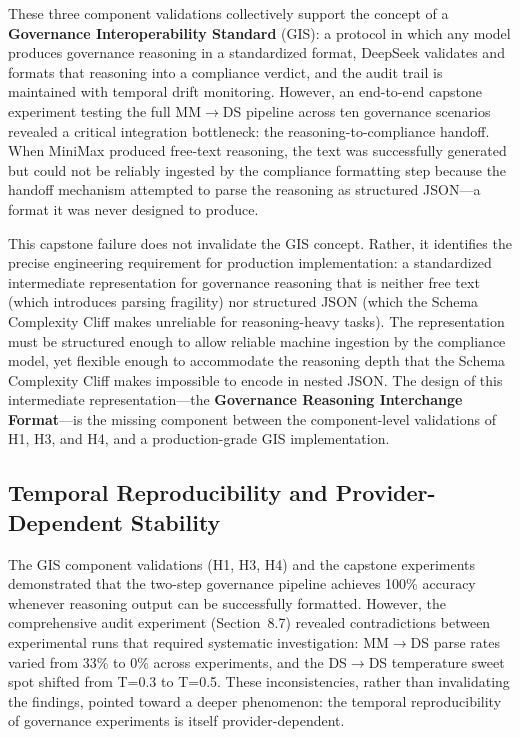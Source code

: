 \documentclass[11pt,a4paper]{article}
\begin{document}
These three component validations collectively support the concept of a \textbf{Governance Interoperability Standard} (GIS): a protocol in which any model produces governance reasoning in a standardized format, DeepSeek validates and formats that reasoning into a compliance verdict, and the audit trail is maintained with temporal drift monitoring. However, an end-to-end capstone experiment testing the full MM$\rightarrow$DS pipeline across ten governance scenarios revealed a critical integration bottleneck: the reasoning-to-compliance handoff. When MiniMax produced free-text reasoning, the text was successfully generated but could not be reliably ingested by the compliance formatting step because the handoff mechanism attempted to parse the reasoning as structured JSON---a format it was never designed to produce.

This capstone failure does not invalidate the GIS concept. Rather, it identifies the precise engineering requirement for production implementation: a standardized intermediate representation for governance reasoning that is neither free text (which introduces parsing fragility) nor structured JSON (which the Schema Complexity Cliff makes unreliable for reasoning-heavy tasks). The representation must be structured enough to allow reliable machine ingestion by the compliance model, yet flexible enough to accommodate the reasoning depth that the Schema Complexity Cliff makes impossible to encode in nested JSON. The design of this intermediate representation---the \textbf{Governance Reasoning Interchange Format}---is the missing component between the component-level validations of H1, H3, and H4, and a production-grade GIS implementation.


\subsection{Temporal Reproducibility and Provider-Dependent Stability}

The GIS component validations (H1, H3, H4) and the capstone experiments demonstrated that the two-step governance pipeline achieves 100\% accuracy whenever reasoning output can be successfully formatted. However, the comprehensive audit experiment (Section~8.7) revealed contradictions between experimental runs that required systematic investigation: MM$\rightarrow$DS parse rates varied from 33\% to 0\% across experiments, and the DS$\rightarrow$DS temperature sweet spot shifted from T=0.3 to T=0.5. These inconsistencies, rather than invalidating the findings, pointed toward a deeper phenomenon: the temporal reproducibility of governance experiments is itself provider-dependent.
\end{document}
